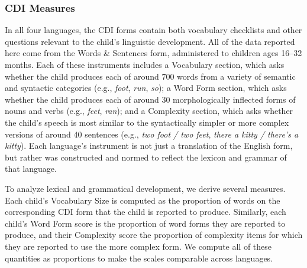\documentclass[10pt,letterpaper]{article}
\begin{document}
\subsubsection{CDI Measures}

In all four languages, the CDI forms contain both vocabulary checklists and other questions relevant to the child's linguistic development. All of the data reported here come from the Words \& Sentences form, administered to children ages 16--32 months. Each of these instruments includes a Vocabulary section, which asks whether the child produces each of around 700 words from a variety of semantic and syntactic categories (e.g., \emph{foot}, \emph{run}, \emph{so}); a Word Form section, which asks whether the child produces each of around 30 morphologically inflected forms of nouns and verbs (e.g., \emph{feet}, \emph{ran}); and a Complexity section, which asks whether the child's speech is most similar to the syntactically simpler or more complex versions of around 40 sentences (e.g., \emph{two foot / two feet}, \emph{there a kitty / there's a kitty}). Each language's instrument is not just a translation of the English form, but rather was constructed and normed to reflect the lexicon and grammar of that language. 

To analyze lexical and grammatical development, we derive several measures. Each child's Vocabulary Size is computed as the proportion of words on the corresponding CDI form that the child is reported to produce. Similarly, each child's Word Form score is the proportion of word forms they are reported to produce, and their Complexity score the proportion of complexity items for which they are reported to use the more complex form. We compute all of these quantities as proportions to make the scales comparable across languages.
\end{document}
